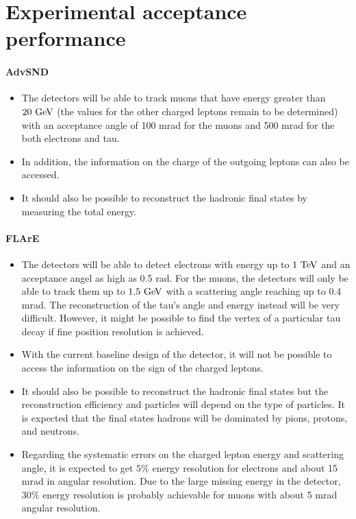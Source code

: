 \documentclass[11pt,a4paper]{article}
\numberwithin{equation}{section}
\numberwithin{figure}{section}
\numberwithin{table}{section}
\begin{document}
{\section{Experimental acceptance performance}

\paragraph{AdvSND} 
\begin{itemize}
    \item The detectors will be able to track muons that have energy greater
    than $20~\rm{GeV}$ (the values for the other charged leptons remain to be
    determined) with an acceptance angle of 100 mrad for the muons and 
    500 mrad for the both electrons and tau.
    \item In addition, the information on the charge of the outgoing leptons
    can also be accessed.
    \item It should also be possible to reconstruct the hadronic final states
    by measuring the total energy.
\end{itemize}

\paragraph{FLArE}
\begin{itemize}
    \item The detectors will be able to detect electrons with energy up to
    $1~\rm{TeV}$ and an acceptance angel as high as 0.5 rad. For the muons,
    the detectors will only be able to track them up to $1.5~\rm{GeV}$ with
    a scattering angle reaching up to 0.4 mrad. The reconstruction of the
    tau's angle and energy instead will be very difficult. However, it might
    be possible to find the vertex of a particular tau decay if fine position
    resolution is achieved.
    \item With the current baseline design of the detector, it will not be
    possible to access the information on the sign of the charged leptons.
    \item It should also be possible to reconstruct the hadronic final
    states but the reconstruction efficiency and particles will depend on
    the type of particles. It is expected that the final states hadrons will
    be dominated by pions, protons, and neutrons.
    \item Regarding the systematic errors on the charged lepton energy and
    scattering angle, it is expected to get $5\%$ energy resolution for
    electrons and about 15 mrad in angular resolution. Due to the large
    missing energy in the detector, $30\%$ energy resolution is probably
    achievable for muons with about 5 mrad angular resolution.
\end{itemize}

}
\end{document}
